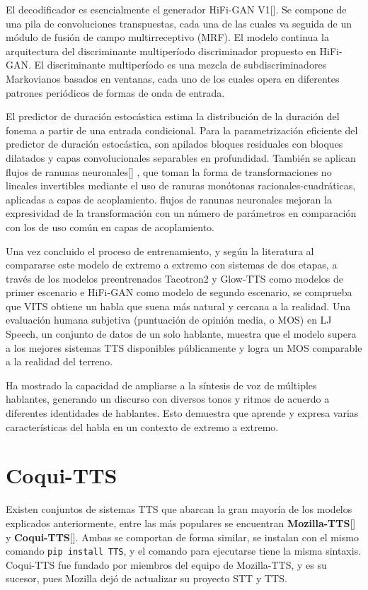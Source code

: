 El decodificador es esencialmente el generador HiFi-GAN V1[\cite{kong2020hifi}]. Se compone de una pila de convoluciones transpuestas, cada una de las cuales va seguida de un módulo de fusión de campo multirreceptivo (MRF). El modelo continua la arquitectura del discriminante multiperíodo discriminador propuesto en HiFi-GAN. El discriminante multiperíodo es una mezcla de subdiscriminadores Markovianos basados en ventanas, cada uno de los cuales opera en diferentes patrones periódicos de formas de onda de entrada.

El predictor de duración estocástica estima la distribución de la duración del fonema a partir de una entrada condicional. Para la parametrización eficiente del predictor de duración estocástica, son apilados bloques residuales con bloques dilatados y capas convolucionales separables en profundidad. También se aplican flujos de ranunas neuronales[\cite{durkan2019neural}] , que toman la forma de transformaciones no lineales invertibles mediante el uso de ranuras monótonas racionales-cuadráticas, aplicadas a capas de acoplamiento. flujos de ranunas neuronales mejoran la expresividad de la transformación con un número de parámetros en comparación con los de uso común en capas de acoplamiento. 

Una vez concluido el proceso de entrenamiento, y según la literatura al compararse este modelo de extremo a extremo con sistemas de dos etapas, a través de los modelos preentrenados Tacotron2 y Glow-TTS como modelos de primer escenario e HiFi-GAN como modelo de segundo escenario, se comprueba que VITS obtiene un habla que suena más natural y cercana a la realidad. Una evaluación humana subjetiva (puntuación de opinión media, o MOS) en LJ Speech, un conjunto de datos de un solo hablante, muestra que el modelo supera a los mejores sistemas TTS disponibles públicamente y logra un MOS comparable a la realidad del terreno.

Ha mostrado la capacidad de ampliarse a la síntesis de voz de múltiples hablantes, generando un discurso con diversos tonos y ritmos de acuerdo a diferentes identidades de hablantes. Esto demuestra que aprende y expresa varias características del habla en un contexto de extremo a extremo.\\

\section{Coqui-TTS}
Existen conjuntos de sistemas TTS que abarcan la gran mayoría de los modelos explicados anteriormente, entre las más populares se encuentran \textbf{Mozilla-TTS}[\cite{mozilla-doc}] y \textbf{Coqui-TTS}[\cite{coqui-doc}]. Ambas se comportan de forma similar, se instalan con el mismo comando \texttt{pip install TTS}, y el comando para ejecutarse tiene la misma sintaxis. Coqui-TTS fue fundado por miembros del equipo de Mozilla-TTS, y es su sucesor, pues Mozilla dejó de actualizar su proyecto STT y TTS.

